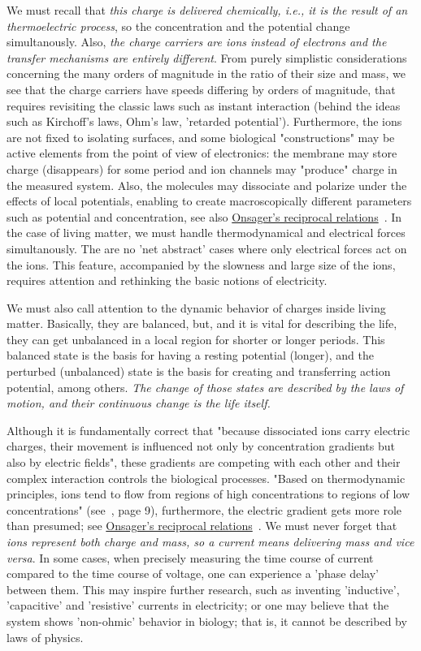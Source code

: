 We must recall that \textit{this charge is delivered chemically,
i.e., it is the result of an thermoelectric process}, so the concentration and the potential change simultanously.
Also, \textit{the charge carriers are ions instead of electrons and the transfer mechanisms are entirely different}.
From purely simplistic considerations concerning the  many orders of magnitude in the ratio of their size and mass, we see that the charge carriers have speeds differing by orders of magnitude, that requires revisiting the classic laws such as instant interaction (behind the ideas such as Kirchoff's laws, Ohm's law, 'retarded potential').
Furthermore, the ions are not fixed to isolating surfaces, and some biological "constructions" may be active elements from the point of view of electronics: the membrane may store charge  (disappears) for some period and ion channels may "produce" charge in the measured system.
Also, the molecules may dissociate and polarize under the effects of local potentials, enabling to create macroscopically different parameters such as potential and concentration, see also \hyperlink{Onsager_relations}
{Onsager's reciprocal relations}~\cite{OnsagerExperimental:1959}. 
In the case of living matter, we must handle thermodynamical and electrical forces simultanously. The are no 'net abstract' cases
where only electrical forces act on the ions. This feature, accompanied by the slowness and large size of the ions, requires attention and rethinking the basic notions of electricity.

We must also call attention to the dynamic behavior of charges
inside living matter. Basically, they are balanced, but, and it is vital for describing the life, they can get unbalanced in a local region for shorter or longer periods. This balanced state is the basis for having a resting potential (longer), and the perturbed (unbalanced) state is the basis for creating and transferring action potential, among others. \textit{The change of those states are described by the laws of motion, and their continuous change is the life itself.}

Although it is fundamentally correct that "because dissociated ions carry electric charges, their movement is influenced not only by concentration gradients but also by electric fields", these gradients are competing with each other and their complex interaction controls the biological processes. "Based on thermodynamic principles,
ions tend to flow from regions of high concentrations to regions of low
concentrations" (see~\cite{JohnstonWuNeurophysiology:1995}, page 9), furthermore, the electric gradient gets more role than presumed; see \hyperlink{Onsager_relations}
{Onsager's reciprocal relations}~\cite{OnsagerExperimental:1959}. 
We must never forget that \textit{ions represent both charge and mass,
so a current means delivering mass and vice versa}.
%
In some cases, when precisely measuring the time course of current
compared to the time course of voltage, one can experience a 'phase delay'
between them. This may inspire further research, such as inventing
'inductive', 'capacitive' and 'resistive' currents in electricity; or one may believe
that the system shows 'non-ohmic' behavior in biology; that is, it cannot be described
by laws of physics.

